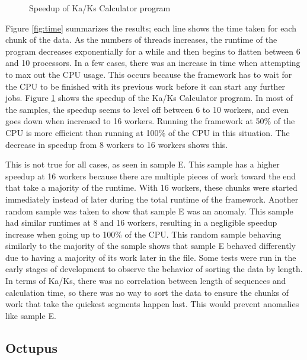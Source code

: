 \documentclass[12pt]{article}
\begin{document}
\begin{figure}
    \begin{center}
    \end{center}
    \caption{Speedup of Ka/Ks Calculator program}
    \label{fig:speedup}
\end{figure}

Figure \ref{fig:time} summarizes the results; each line shows the time taken for
each chunk of the data. As the numbers of threads increases, the runtime of the
program decreases exponentially for a while and then begins to flatten between 6
and 10 processors. In a few cases, there was an increase in time when attempting
to max out the CPU usage. This occurs because the framework has to wait for the
CPU to be finished with its previous work before it can start any further jobs.
Figure \ref{fig:speedup} shows the speedup of the Ka/Ks Calculator program.  In
most of the samples, the speedup seems to level off between 6 to 10 workers, and
even goes down when increased to 16 workers. Running the framework at 50\% of
the CPU is more efficient than running at 100\% of the CPU in this situation.
The decrease in speedup from 8 workers to 16 workers shows this.

This is not true for all cases, as seen in sample E. This sample has a higher
speedup at 16 workers because there are multiple pieces of work toward the end
that take a majority of the runtime. With 16 workers, these chunks were started
immediately instead of later during the total runtime of the framework. Another
random sample was taken to show that sample E was an anomaly. This sample had
similar runtimes at 8 and 16 workers, resulting in a negligible speedup increase
when going up to 100\% of the CPU. This random sample behaving similarly to the
majority of the sample shows that sample E behaved differently due to having a
majority of its work later in the file. Some tests were run in the early stages
of development to observe the behavior of sorting the data by length. In terms
of Ka/Ks, there was no correlation between length of sequences and calculation
time, so there was no way to sort the data to ensure the chunks of work that
take the quickest segments happen last. This would prevent anomalies like sample
E.

\subsection{Octupus}
\end{document}
